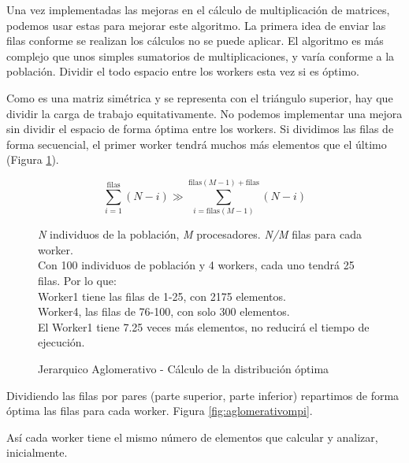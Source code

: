 	
		Una vez implementadas las mejoras en el cálculo de multiplicación de matrices, podemos usar estas para mejorar este algoritmo. La primera idea de enviar las filas conforme se realizan los cálculos no se puede aplicar. El algoritmo es más complejo que unos simples sumatorios de multiplicaciones, y varía conforme a la población. Dividir el todo espacio entre los workers esta vez si es óptimo.
		
		Como es una matriz simétrica y se representa con el triángulo superior, hay que dividir la carga de trabajo equitativamente. No podemos implementar una mejora sin dividir el espacio de forma óptima entre los workers. Si dividimos las filas de forma secuencial, el primer worker tendrá muchos más elementos que el último (Figura \ref{fig:JA_distribucion}). 
	
		
		\begin{figure}			
		\begin{mdframed}[roundcorner=5pt]
			\[
			\sum_{i=1}^{\text{filas}} (N - i) \gg \sum_{i=\text{filas}(M-1)}^{\text{filas}(M-1) + \text{filas}} (N - i)
			\]
			\begin{tcolorbox}[boxrule=0.5pt, fontupper=\small]
				
				\textit{N} individuos de la población, \textit{M} procesadores. \textit{N/M} filas para cada worker.\\
				
				Con 100 individuos de población y 4 workers, cada uno tendrá 25 filas. Por lo que:\\
				Worker1 tiene las filas de 1-25, con 2175 elementos. \\
				Worker4, las filas de 76-100, con solo 300 elementos. \\
				El Worker1 tiene 7.25 veces más elementos, no reducirá el tiempo de ejecución.
							
			\end{tcolorbox}
			
		\end{mdframed}
		\label{fig:JA_distribucion}
		\caption{Jerarquico Aglomerativo - Cálculo de la distribución óptima}
		\end{figure}
		
		
		Dividiendo las filas por pares (parte superior, parte inferior) repartimos de forma óptima las filas para cada worker. Figura \ref{fig:aglomerativompi}.
		
		Así cada worker tiene el mismo número de elementos que calcular y analizar, inicialmente. 
		
